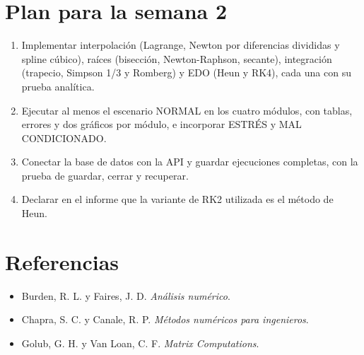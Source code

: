 \documentclass[
  11pt,
  letterpaper,
]{article}
\providecommand{\tightlist}{%
  \setlength{\itemsep}{0pt}\setlength{\parskip}{0pt}}
\begin{document}
\hypertarget{plan-para-la-semana-2}{%
\section{Plan para la semana 2}\label{plan-para-la-semana-2}}

\begin{enumerate}
\def\labelenumi{\arabic{enumi}.}
\tightlist
\item
  Implementar interpolación (Lagrange, Newton por diferencias divididas
  y spline cúbico), raíces (bisección, Newton-Raphson, secante),
  integración (trapecio, Simpson 1/3 y Romberg) y EDO (Heun y RK4), cada
  una con su prueba analítica.
\item
  Ejecutar al menos el escenario NORMAL en los cuatro módulos, con
  tablas, errores y dos gráficos por módulo, e incorporar ESTRÉS y MAL
  CONDICIONADO.
\item
  Conectar la base de datos con la API y guardar ejecuciones completas,
  con la prueba de guardar, cerrar y recuperar.
\item
  Declarar en el informe que la variante de RK2 utilizada es el método
  de Heun.
\end{enumerate}

\hypertarget{referencias}{%
\section*{Referencias}\label{referencias}}

\begin{itemize}
\tightlist
\item
  Burden, R. L. y Faires, J. D. \emph{Análisis numérico}.
\item
  Chapra, S. C. y Canale, R. P. \emph{Métodos numéricos para
  ingenieros}.
\item
  Golub, G. H. y Van Loan, C. F. \emph{Matrix Computations}.
\end{itemize}
\end{document}
